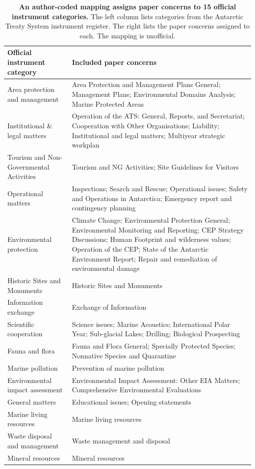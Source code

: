 \documentclass{fun_article}
\begin{document}
\begin{table}[!htbp]
\centering
\scriptsize
\caption{\textbf{An author-coded mapping assigns paper concerns to 15 official instrument categories.} The left column lists categories from the Antarctic Treaty System instrument register. The right lists the paper concerns assigned to each. The mapping is unofficial.}
\label{tab:output-category-crosswalk}
\begin{tabular}{@{}p{}p{}@{}}
\toprule
Official instrument category & Included paper concerns \\
\midrule
Area protection and management & Area Protection and Management Plans General; Management Plans; Environmental Domains Analysis; Marine Protected Areas \\
Institutional \& legal matters & Operation of the ATS: General, Reports, and Secretariat; Cooperation with Other Organisations; Liability; Institutional and legal matters; Multiyear strategic workplan \\
Tourism and Non-Governmental Activities & Tourism and NG Activities; Site Guidelines for Visitors \\
Operational matters & Inspections; Search and Rescue; Operational issues; Safety and Operations in Antarctica; Emergency report and contingency planning \\
Environmental protection & Climate Change; Environmental Protection General; Environmental Monitoring and Reporting; CEP Strategy Discussions; Human Footprint and wilderness values; Operation of the CEP; State of the Antarctic Environment Report; Repair and remediation of environmental damage \\
Historic Sites and Monuments & Historic Sites and Monuments \\
Information exchange & Exchange of Information \\
Scientific cooperation & Science issues; Marine Acoustics; International Polar Year; Sub-glacial Lakes; Drilling; Biological Prospecting \\
Fauna and flora & Fauna and Flora General; Specially Protected Species; Nonnative Species and Quarantine \\
Marine pollution & Prevention of marine pollution \\
Environmental impact assessment & Environmental Impact Assessment: Other EIA Matters; Comprehensive Environmental Evaluations \\
General matters & Educational issues; Opening statements \\
Marine living resources & Marine living resources \\
Waste disposal and management & Waste management and disposal \\
Mineral resources & Mineral resources \\
\bottomrule
\end{tabular}
\end{table}
\end{document}
